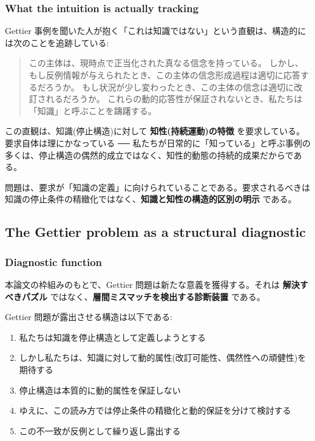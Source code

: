 \subsubsection{What the intuition is actually tracking}


Gettier 事例を聞いた人が抱く「これは知識ではない」という直観は、構造的には次のことを追跡している:

\begin{quote}
この主体は、現時点で正当化された真なる信念を持っている。
しかし、もし反例情報が与えられたとき、この主体の信念形成過程は適切に応答するだろうか。
もし状況が少し変わったとき、この主体の信念は適切に改訂されるだろうか。
これらの動的応答性が保証されないとき、私たちは「知識」と呼ぶことを躊躇する。
\end{quote}

この直観は、知識(停止構造)に対して \textbf{知性(持続運動)の特徴} を要求している。要求自体は理にかなっている ── 私たちが日常的に「知っている」と呼ぶ事例の多くは、停止構造の偶然的成立ではなく、知性的動態の持続的成果だからである。

問題は、要求が「知識の定義」に向けられていることである。要求されるべきは知識の停止条件の精緻化ではなく、\textbf{知識と知性の構造的区別の明示} である。

\subsection{The Gettier problem as a structural diagnostic}


\subsubsection{Diagnostic function}


本論文の枠組みのもとで、Gettier 問題は新たな意義を獲得する。それは \textbf{解決すべきパズル} ではなく、\textbf{層間ミスマッチを検出する診断装置} である。

Gettier 問題が露出させる構造は以下である:

\begin{enumerate}
\item 私たちは知識を停止構造として定義しようとする
\item しかし私たちは、知識に対して動的属性(改訂可能性、偶然性への頑健性)を期待する
\item 停止構造は本質的に動的属性を保証しない
\item ゆえに、この読み方では停止条件の精緻化と動的保証を分けて検討する
\item この不一致が反例として繰り返し露出する
\end{enumerate}

